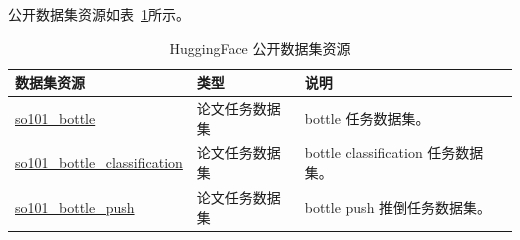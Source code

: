 \begin{appendices}
公开数据集资源如表~\ref{tab:hf-datasets}所示。

\begin{table}[htbp]
  \centering
  \caption{HuggingFace 公开数据集资源}
  \label{tab:hf-datasets}
  \small
  \begin{tabularx}{\textwidth}{@{}p{}p{}X@{}}
    \toprule
    数据集资源 & 类型 & 说明 \\
    \midrule
    \href{https://huggingface.co/datasets/Vel044/so101_bottle}{so101\_bottle}
      & 论文任务数据集
      & bottle 任务数据集。 \\
    \href{https://huggingface.co/datasets/Vel044/so101_bottle_classification}{so101\_bottle\_classification}
      & 论文任务数据集
      & bottle classification 任务数据集。 \\
    \href{https://huggingface.co/datasets/Vel044/so101_bottle_push}{so101\_bottle\_push}
      & 论文任务数据集
      & bottle push 推倒任务数据集。 \\
    \bottomrule
  \end{tabularx}
\end{table}

\end{appendices}
